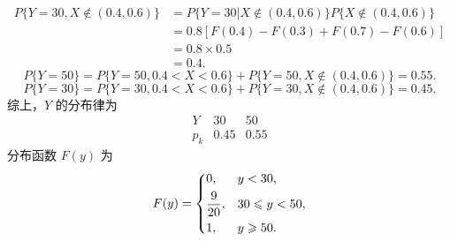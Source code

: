 \documentclass{article}
\begin{document}
\begin{solution}
$$\begin{aligned}
        \end{aligned}
    $$
    $$
        \begin{aligned}
            P\{Y=30 , X \notin (0.4,0.6)\}
             & = P\{Y=30 |  X \notin (0.4,0.6)\}P\{X \notin (0.4,0.6)\} \\
             & = 0.8 [F(0.4)-F(0.3) + F(0.7)-F(0.6)]                    \\
             & = 0.8 \times 0.5                                         \\
             & = 0.4.
        \end{aligned}
    $$
    $$
        P\{Y=50\} = P\{Y=50 , 0.4<X<0.6\} + P\{Y=50 , X \notin (0.4,0.6)\} = 0.55.
    $$
    $$
        P\{Y=30\} = P\{Y=30, 0.4<X<0.6\} + P\{Y=30 , X \notin (0.4,0.6)\} = 0.45.
    $$
    综上，$Y$ 的分布律为
    $$
        \begin{array}{c|ccc}
            Y   & 30   & 50   \\
            \hline
            p_k & 0.45 & 0.55
        \end{array}
    $$
    分布函数 $F(y)$ 为
    $$
        F(y) = \begin{dcases}
            0,            & y < 30,              \\
            \frac{9}{20}, & 30 \leqslant y < 50, \\
            1,            & y \geqslant 50.
        \end{dcases}
    $$
\end{solution}
\end{document}
